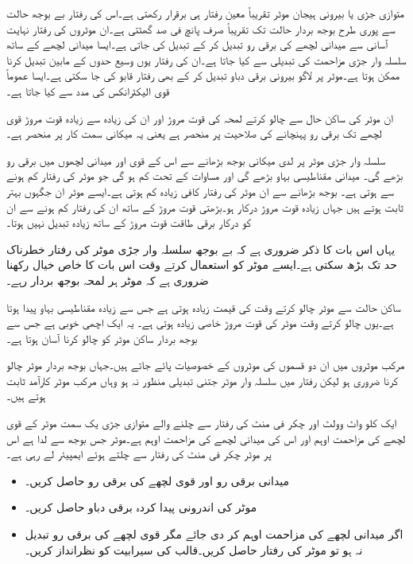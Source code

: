 متوازی جڑی یا بیرونی ہیجان موٹر تقریباً معین رفتار ہی برقرار رکھتی ہے۔اس کی رفتار بے بوجھ حالت سے پوری طرح بوجھ بردار حالت تک تقریباً صرف پانچ فی صد گھٹتی ہے۔ان موٹروں کی رفتار نہایت آسانی سے میدانی لچھے کی برقی رو تبدیل کر کے تبدیل کی جاتی ہے۔ایسا میدانی لچھے کے ساتھ سلسلہ وار جڑی مزاحمت کی تبدیلی سے کیا جاتا ہے۔ان کی رفتار یوں وسیع حدوں کے مابین تبدیل کرنا ممکن ہوتا ہے۔موٹر پر لاگو بیرونی برقی دباو تبدیل کر کے بھی رفتار قابو کی جا سکتی ہے۔ایسا عموماً قوی الیکٹرانکس کی مدد سے کیا جاتا ہے۔

ان موٹر کی ساکن حال سے چالو کرتے لمحہ کی قوت مروڑ اور ان کی زیادہ سے زیادہ قوت مروڑ قوی لچھے تک برقی رو پہنچانے کی صلاحیت پر منحصر ہے یعنی یہ میکانی سمت کار پر منحصر ہے۔

سلسلہ وار جڑی موٹر پر لدی میکانی بوجھ بڑھانے سے اس کے قوی اور میدانی لچھوں میں برقی رو بڑھے گی۔ میدانی مقناطیسی بہاو بڑھے گی اور مساوات   کے تحت  کم ہو گی جو موٹر کی رفتار کم ہونے سے ہوتی ہے۔ بوجھ بڑھانے سے ان موٹر کی رفتار کافی زیادہ کم ہوتی ہے۔ایسے موٹر ان جگہوں بہتر ثابت ہوتے ہیں جہاں زیادہ قوت مروڑ درکار ہو۔بڑھتی قوت مروڑ کے ساتھ ان کی رفتار کم ہونے سے ان کو درکار برقی طاقت قوت مروڑ کے ساتھ زیادہ تبدیل نہیں ہوتا۔

یہاں اس بات کا ذکر ضروری ہے کہ بے بوجھ سلسلہ وار جڑی موٹر کی رفتار خطرناک حد تک بڑھ سکتی ہے۔ایسے موٹر کو استعمال کرتے وقت اس بات کا خاص خیال رکھنا ضروری ہے کہ موٹر ہر لمحہ بوجھ بردار رہے۔

ساکن حالت سے موٹر چالو کرتے وقت    کی قیمت زیادہ ہوتی ہے جس سے زیادہ  مقناطیسی بہاو پیدا ہوتا ہے۔یوں چالو کرتے وقت موٹر کی قوت مروڑ خاصی زیادہ ہوتی ہے۔ یہ ایک اچھی خوبی ہے جس سے بوجھ بردار ساکن موٹر کو چالو کرنا آسان ہوتا ہے۔

مرکب موٹروں میں ان دو قسموں کی موٹروں کے خصوصیات پائے جاتے ہیں۔جہاں بوجھ بردار موٹر چالو کرنا ضروری ہو لیکن رفتار میں سلسلہ وار موٹر جتنی تبدیلی منظور نہ ہو وہاں مرکب موٹر کارآمد ثابت ہوتے ہیں۔

ایک   کلو واٹ  وولٹ اور  چکر فی منٹ کی رفتار سے چلنے والے متوازی جڑی یک سمت  موٹر کے قوی لچھے کی مزاحمت  اوہم اور اس کی میدانی لچھے کی مزاحمت   اوہم ہے۔موٹر جس بوجھ سے لدا ہے اس پر موٹر   چکر فی منٹ کی رفتار سے چلتے ہوئے   ایمپیئر لے رہی ہے۔ 
\begin{itemize}
\item
میدانی برقی رو اور قوی لچھے کی برقی رو حاصل کریں۔
\item
موٹر کی اندرونی پیدا کردہ برقی دباو حاصل کریں۔
\item
اگر میدانی لچھے کی مزاحمت  اوہم کر دی جائے  مگر قوی لچھے کی برقی رو تبدیل نہ ہو  تو موٹر کی رفتار حاصل کریں۔قالب کی سیرابیت کو نظرانداز کریں۔
\end{itemize}

